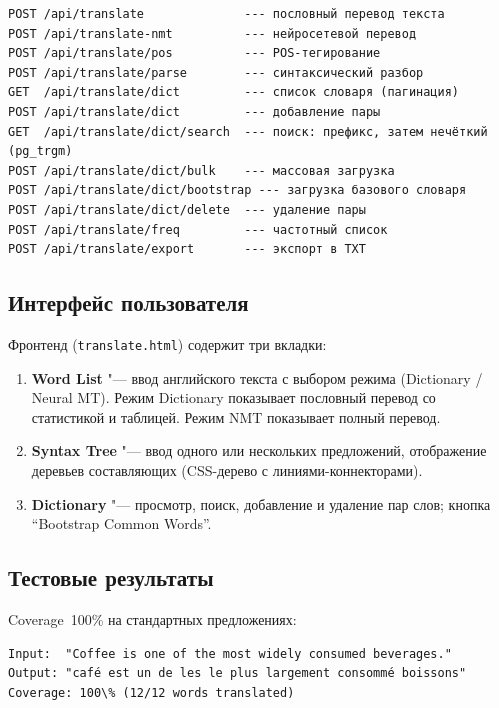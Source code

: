 \begin{lstlisting}[caption={HTTP эндпоинты подсистемы перевода.},label={lst:translate_api}]
POST /api/translate              --- пословный перевод текста
POST /api/translate-nmt          --- нейросетевой перевод
POST /api/translate/pos          --- POS-тегирование
POST /api/translate/parse        --- синтаксический разбор
GET  /api/translate/dict         --- список словаря (пагинация)
POST /api/translate/dict         --- добавление пары
GET  /api/translate/dict/search  --- поиск: префикс, затем нечёткий (pg_trgm)
POST /api/translate/dict/bulk    --- массовая загрузка
POST /api/translate/dict/bootstrap --- загрузка базового словаря
POST /api/translate/dict/delete  --- удаление пары
POST /api/translate/freq         --- частотный список
POST /api/translate/export       --- экспорт в TXT
\end{lstlisting}

\subsection{Интерфейс пользователя}

Фронтенд (\texttt{translate.html}) содержит три вкладки:

\begin{enumerate}
	\item \textbf{Word List} "--- ввод английского текста с выбором режима
	      (Dictionary / Neural MT). Режим Dictionary показывает пословный
	      перевод со статистикой и таблицей. Режим NMT показывает полный
	      перевод.
	\item \textbf{Syntax Tree} "--- ввод одного или нескольких предложений,
	      отображение деревьев составляющих (CSS-дерево с линиями-коннекторами).
	\item \textbf{Dictionary} "--- просмотр, поиск, добавление и удаление
	      пар слов; кнопка ``Bootstrap Common Words''.
\end{enumerate}

\subsection{Тестовые результаты}

Coverage~100\% на стандартных предложениях:

\begin{lstlisting}[caption={Результат пословного перевода.},label={lst:translate_result}]
Input:  "Coffee is one of the most widely consumed beverages."
Output: "café est un de les le plus largement consommé boissons"
Coverage: 100\% (12/12 words translated)
\end{lstlisting}

